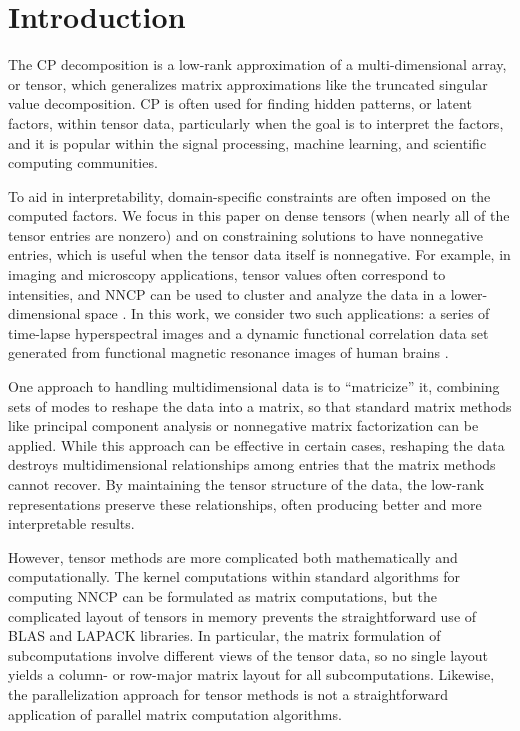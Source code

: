 
\section{Introduction}

The CP decomposition is a low-rank approximation of a multi-dimensional array, or tensor, which generalizes matrix approximations like the truncated singular value decomposition.
CP is often used for finding hidden patterns, or latent factors, within tensor data, particularly when the goal is to interpret the factors, and it is popular within the signal processing, machine learning, and scientific computing communities.

To aid in interpretability, domain-specific constraints are often imposed on the computed factors.
We focus in this paper on dense tensors (when nearly all of the tensor entries are nonzero) and on constraining solutions to have nonnegative entries, which is useful when the tensor data itself is nonnegative.
For example, in imaging and microscopy applications, tensor values often correspond to intensities, and NNCP can be used to cluster and analyze the data in a lower-dimensional space \cite{JC+16}.
In this work, we consider two such applications: a series of time-lapse hyperspectral images \cite{FAN16} and a dynamic functional correlation data set generated from functional magnetic resonance images of human brains \cite{VEU+12}.

One approach to handling multidimensional data is to ``matricize'' it, combining sets of modes to reshape the data into a matrix, so that standard matrix  methods like principal component analysis or nonnegative matrix factorization can be applied.
While this approach can be effective in certain cases, reshaping the data destroys multidimensional relationships among entries that the matrix methods cannot recover.
By maintaining the tensor structure of the data, the low-rank representations preserve these relationships, often producing better and more interpretable results.

However, tensor methods are more complicated both mathematically and computationally.
The kernel computations within standard algorithms for computing NNCP can be formulated as matrix computations, but the complicated layout of tensors in memory prevents the straightforward use of BLAS and LAPACK libraries.
In particular, the matrix formulation of subcomputations involve different views of the tensor data, so no single layout yields a column- or row-major matrix layout for all subcomputations.
Likewise, the parallelization approach for tensor methods is not a straightforward application of parallel matrix computation algorithms.

